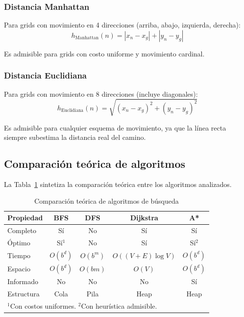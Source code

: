 \subsubsection{Distancia Manhattan}

Para grids con movimiento en 4 direcciones (arriba, abajo, izquierda, derecha):
\begin{equation}
    h_{\text{Manhattan}}(n) = |x_n - x_g| + |y_n - y_g|
    \label{eq:manhattan}
\end{equation}

Es admisible para grids con costo uniforme y movimiento cardinal.

\subsubsection{Distancia Euclidiana}

Para grids con movimiento en 8 direcciones (incluye diagonales):
\begin{equation}
    h_{\text{Euclidiana}}(n) = \sqrt{(x_n - x_g)^2 + (y_n - y_g)^2}
    \label{eq:euclidean}
\end{equation}

Es admisible para cualquier esquema de movimiento, ya que la línea recta siempre subestima la distancia real del camino.

\subsection{Comparación teórica de algoritmos}

La Tabla~\ref{tab:comparison} sintetiza la comparación teórica entre los algoritmos analizados.

\begin{table}[H]
\centering
\caption{Comparación teórica de algoritmos de búsqueda}
\label{tab:comparison}
\renewcommand{\arraystretch}{1.3}
\begin{tabular}{@{}lcccc@{}}
\toprule
\textbf{Propiedad} & \textbf{BFS} & \textbf{DFS} & \textbf{Dijkstra} & \textbf{A*} \\
\midrule
Completo & Sí & No & Sí & Sí \\
Óptimo & Sí$^1$ & No & Sí & Sí$^2$ \\
Tiempo & $O(b^d)$ & $O(b^m)$ & $O((V\!+\!E)\log V)$ & $O(b^d)$ \\
Espacio & $O(b^d)$ & $O(bm)$ & $O(V)$ & $O(b^d)$ \\
Informado & No & No & No & Sí \\
Estructura & Cola & Pila & Heap & Heap \\
\bottomrule
\multicolumn{5}{l}{\footnotesize $^1$Con costos uniformes. $^2$Con heurística admisible.}
\end{tabular}
\end{table}
